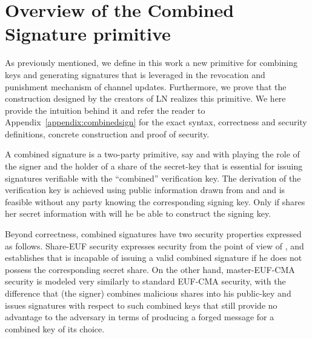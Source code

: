 \section{Overview of the Combined Signature primitive}
\label{sec:ov-combined-ds}
  As previously mentioned, we define in this work a new primitive for combining
  keys and generating signatures that is leveraged in the revocation and
  punishment mechanism of channel updates. Furthermore, we prove that the
  construction designed by the creators of LN realizes this primitive. We here
  provide the intuition behind it and refer the reader to
  Appendix~\ref{appendix:combinedsign} for the exact syntax, correctness and
  security definitions, concrete construction and proof of security.

  A combined signature is a two-party primitive, say \alice{} and \bob{} with
  \bob{} playing the role of the signer and \alice{} the holder of a share of
  the secret-key that is essential for issuing signatures verifiable with the
  ``combined'' verification key. The  derivation of the verification key is
  achieved  using public information drawn from  \alice{} and \bob{} and is
  feasible without any party knowing the corresponding signing key. Only if
  \alice{} shares her secret information with \bob{} will he be able to
  construct the signing key.

  Beyond correctness, combined signatures have two security properties expressed
  as follows. Share-EUF security expresses security from the point of view of
  \alice{}, and establishes that \bob{} is incapable of issuing a valid combined
  signature if he does not possess the corresponding secret share. On the other
  hand, master-EUF-CMA security is modeled very similarly to standard EUF-CMA
  security, with the difference that \bob{} (the signer) combines malicious
  shares into his public-key and issues signatures with respect to such combined
  keys that still provide no advantage to the adversary in terms of producing a
  forged message for a combined key of its choice.


